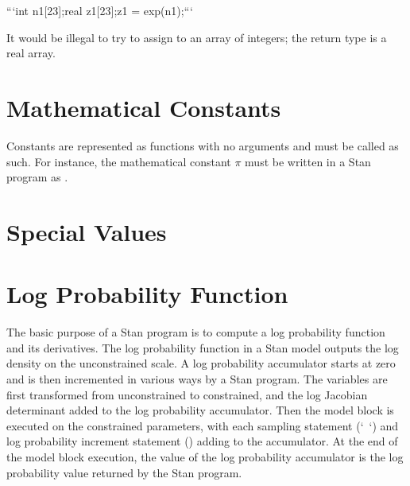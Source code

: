 \begin{description}
{```\n int n1[23];\n real z1[23];\n z1 = exp(n1);\n ```


It would be illegal to try to assign  to an array of integers; the return type is a real array.


\section{Mathematical Constants}\label{built-in-constants.section}


Constants are represented as functions with no arguments and must be called as such.  For instance, the mathematical constant $\pi$ must be written in a Stan program as .


\begin{description}      \end{description}


\section{Special Values}


\begin{description}     \end{description}


\section{Log Probability Function}\label{get-lp.section}


The basic purpose of a Stan program is to compute a log probability function and its derivatives.  The log probability function in a Stan model outputs the log density on the unconstrained scale.  A log probability accumulator starts at zero and is then incremented in various ways by a Stan program.  The variables are first transformed from unconstrained to constrained, and the log Jacobian determinant added to the log probability accumulator.  Then the model block is executed on the constrained parameters, with each sampling statement (`~`) and log probability increment statement () adding to the accumulator.  At the end of the model block execution, the value of the log probability accumulator is the log probability value returned by the Stan program.


}
\end{description}
